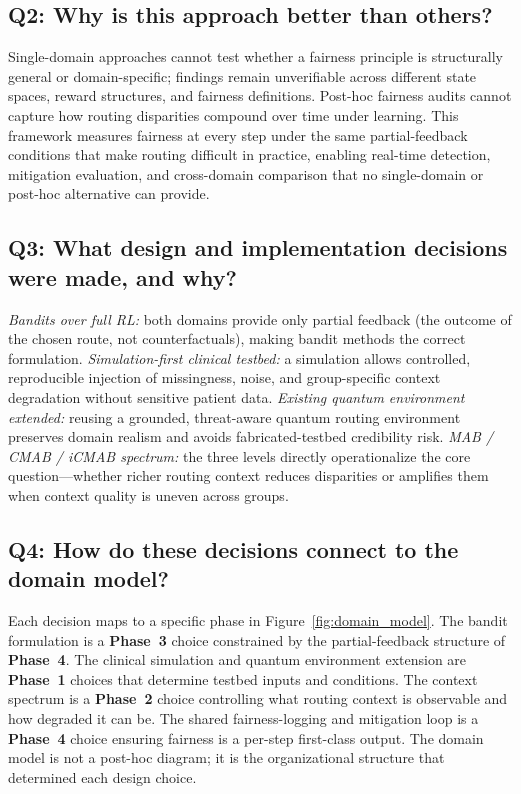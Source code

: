 \documentclass{IEEEtran}
\begin{document}
\subsection{Q2: Why is this approach better than others?}
Single-domain approaches cannot test whether a fairness principle is
structurally general or domain-specific; findings remain unverifiable across
different state spaces, reward structures, and fairness definitions. Post-hoc
fairness audits cannot capture how routing disparities compound over time
under learning. This framework measures fairness at every step under the
same partial-feedback conditions that make routing difficult in practice,
enabling real-time detection, mitigation evaluation, and cross-domain
comparison that no single-domain or post-hoc alternative can provide.

\subsection{Q3: What design and implementation decisions were made, and why?}
\textit{Bandits over full RL:} both domains provide only partial feedback
(the outcome of the chosen route, not counterfactuals), making bandit methods
the correct formulation. \textit{Simulation-first clinical testbed:} a
simulation allows controlled, reproducible injection of missingness, noise,
and group-specific context degradation without sensitive patient data.
\textit{Existing quantum environment extended:} reusing a grounded,
threat-aware quantum routing environment preserves domain realism and avoids
fabricated-testbed credibility risk. \textit{MAB / CMAB / iCMAB spectrum:}
the three levels directly operationalize the core question---whether richer
routing context reduces disparities or amplifies them when context quality
is uneven across groups.

\subsection{Q4: How do these decisions connect to the domain model?}
Each decision maps to a specific phase in Figure~\ref{fig:domain_model}.
The bandit formulation is a \textbf{Phase~3} choice constrained by the
partial-feedback structure of \textbf{Phase~4}. The clinical simulation and
quantum environment extension are \textbf{Phase~1} choices that determine
testbed inputs and conditions. The context spectrum is a \textbf{Phase~2}
choice controlling what routing context is observable and how degraded it
can be. The shared fairness-logging and mitigation loop is a
\textbf{Phase~4} choice ensuring fairness is a per-step first-class output.
The domain model is not a post-hoc diagram; it is the organizational
structure that determined each design choice.
\end{document}
